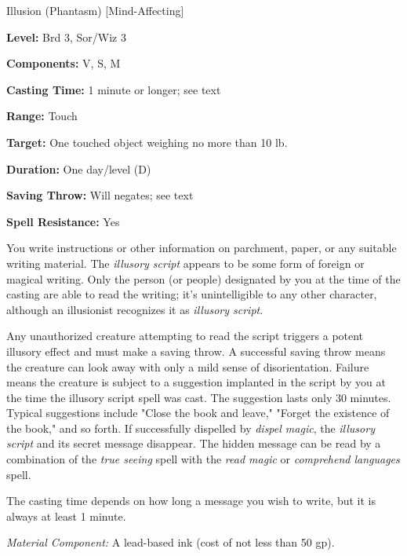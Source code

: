 
Illusion (Phantasm) [Mind-Affecting]

\textbf{Level:} Brd 3, Sor/Wiz 3

\textbf{Components:} V, S, M

\textbf{Casting Time:} 1 minute or longer; see text

\textbf{Range:} Touch

\textbf{Target:} One touched object weighing no more than 10 lb.

\textbf{Duration:} One day/level (D)

\textbf{Saving Throw:} Will negates; see text

\textbf{Spell Resistance:} Yes

You write instructions or other information on parchment, paper, or any suitable 
writing material. The \textit{illusory script} appears to be some form of foreign 
or magical writing. Only the person (or people) designated by you at the time of 
the casting are able to read the writing; it's unintelligible to any other character, 
although an illusionist recognizes it as \textit{illusory script}.

Any unauthorized creature attempting to read the script triggers a potent illusory 
effect and must make a saving throw. A successful saving throw means the creature 
can look away with only a mild sense of disorientation. Failure means the creature 
is subject to a suggestion implanted in the script by you at the time the illusory 
script spell was cast. The suggestion lasts only 30 minutes. Typical suggestions 
include "Close the book and leave," "Forget the existence of the book," and 
so forth. If successfully dispelled by \textit{dispel magic}, the \textit{illusory 
script} and its secret message disappear. The hidden message can be read by a combination 
of the \textit{true seeing} spell with the \textit{read magic} or \textit{comprehend 
languages} spell.

The casting time depends on how long a message you wish to write, but it is always 
at least 1 minute.

\textit{Material Component:} A lead-based ink (cost of not less than 50 gp).

